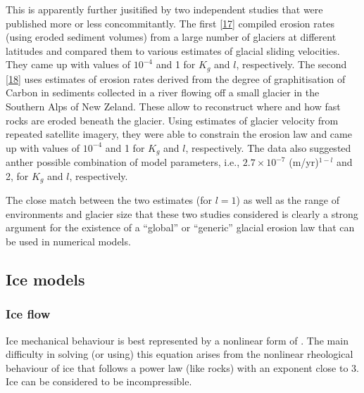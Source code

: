 \documentclass[letterpaper,10pt,english]{jupyterBook}
\begin{document}
\sphinxAtStartPar
This is apparently further jusitified by two independent studies that were published more or less concommitantly. The first {[}\hyperlink{cite.references:id20}{17}{]} compiled erosion rates (using eroded sediment volumes) from a large number of glaciers at different latitudes and compared them to various estimates of glacial sliding velocities. They came up with values of \(10^{-4}\) and 1 for \(K_g\) and \(l\), respectively. The second {[}\hyperlink{cite.references:id21}{18}{]} uses estimates of erosion rates derived from the degree of graphitisation of Carbon in sediments collected in a river flowing off a small glacier in the Southern Alps of New Zeland. These allow to reconstruct where and how fast rocks are eroded beneath the glacier. Using estimates of glacier velocity from repeated satellite imagery, they were able to constrain the erosion law and came up with values of \(10^{-4}\) and 1 for \(K_g\) and \(l\), respectively. The data also suggested anther possible combination of model parameters, i.e., \(2.7\times 10^{-7}\) (m/yr)\(^{1-l}\) and 2, for \(K_g\) and \(l\), respectively.

\sphinxAtStartPar
The close match between the two estimates (for \(l=1\)) as well as the range of environments and glacier size that these two studies considered is clearly a strong argument for the existence of a “global” or “generic” glacial erosion law that can be used in numerical models.

\sphinxstepscope


\subsection{Ice models}
\label{\detokenize{glacial-models:ice-models}}\label{\detokenize{glacial-models::doc}}

\subsubsection{Ice flow}
\label{\detokenize{glacial-models:ice-flow}}
\sphinxAtStartPar
Ice mechanical behaviour is best represented by a non\sphinxhyphen{}linear form of {\hyperref[\detokenize{stokes:stokes-section}]{}}. The main difficulty in solving (or using) this equation arises from the non\sphinxhyphen{}linear rheological behaviour of ice that follows a power law (like rocks) with an exponent close to 3. Ice can be considered to be incompressible.
\end{document}

